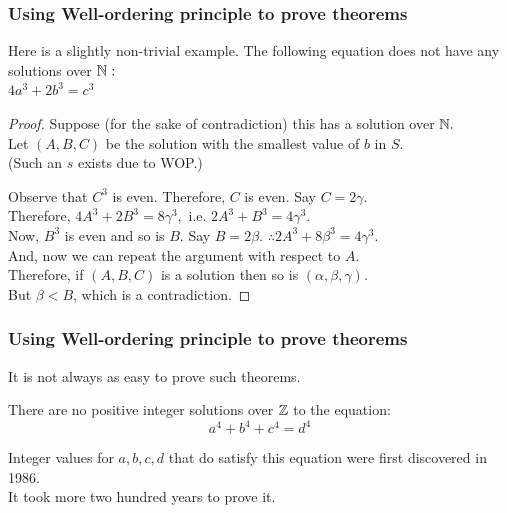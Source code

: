  \begin{frame}[fragile]
\frametitle{Using Well-ordering principle to prove theorems}
Here is a slightly non-trivial example. The following equation does not have any solutions over ${{\mathbb{N}}}:$\\

$4a^3+2b^3 = c^3$


\begin{proof}
Suppose (for the sake of contradiction) this has a solution over ${{\mathbb{N}}}.$ \\
Let $(A,B,C)$ be the solution with the smallest value of $b$ in $S$. \\

(Such an $s$ exists due to WOP.) 

Observe that $C^3$ is even. Therefore, $C$ is even. Say $C = 2\gamma$. \\
Therefore, $4A^3 + 2B^3 = 8\gamma^3,$ i.e. $2A^3 + B^3 = 4\gamma^3$. \\

Now, $B^3$ is even and so is $B$. Say $B = 2\beta$. $\therefore 2A^3 + 8\beta^3 = 4\gamma^3$.\\

And, now we can repeat the argument with respect to $A$. \\
Therefore, if $(A,B,C)$ is a solution then so is $(\alpha, \beta, \gamma)$.\\

But $\beta < B$, which is a contradiction. 

\end{proof}


\end{frame}


 \begin{frame}[fragile]
\frametitle{Using Well-ordering principle to prove theorems}
It is not always as easy to prove such theorems.
\begin{conj}[Euler, 1769]
There are no positive integer solutions over ${{\mathbb{Z}}}$ to the
equation:
$$a^4 + b^4 + c^4 = d^4$$
\end{conj}

Integer values for $a, b, c, d$ that do satisfy this equation were first discovered in
1986. \\
It took more two hundred years to prove it.
\end{frame}

